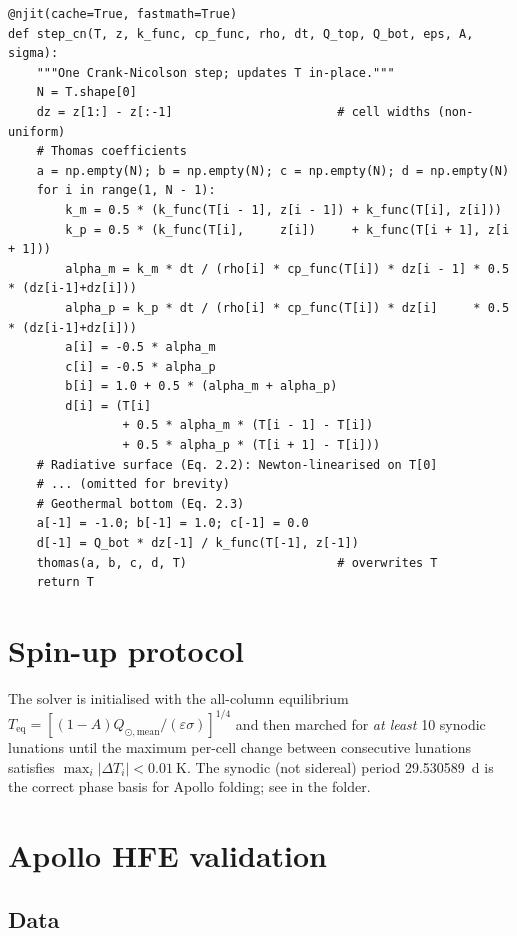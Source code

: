 \begin{lstlisting}[caption={Crank--Nicolson inner loop from \code{lunar/solver\_cn.py} (abridged).},label={lst:solver-core}]
@njit(cache=True, fastmath=True)
def step_cn(T, z, k_func, cp_func, rho, dt, Q_top, Q_bot, eps, A, sigma):
    """One Crank-Nicolson step; updates T in-place."""
    N = T.shape[0]
    dz = z[1:] - z[:-1]                       # cell widths (non-uniform)
    # Thomas coefficients
    a = np.empty(N); b = np.empty(N); c = np.empty(N); d = np.empty(N)
    for i in range(1, N - 1):
        k_m = 0.5 * (k_func(T[i - 1], z[i - 1]) + k_func(T[i], z[i]))
        k_p = 0.5 * (k_func(T[i],     z[i])     + k_func(T[i + 1], z[i + 1]))
        alpha_m = k_m * dt / (rho[i] * cp_func(T[i]) * dz[i - 1] * 0.5 * (dz[i-1]+dz[i]))
        alpha_p = k_p * dt / (rho[i] * cp_func(T[i]) * dz[i]     * 0.5 * (dz[i-1]+dz[i]))
        a[i] = -0.5 * alpha_m
        c[i] = -0.5 * alpha_p
        b[i] = 1.0 + 0.5 * (alpha_m + alpha_p)
        d[i] = (T[i]
                + 0.5 * alpha_m * (T[i - 1] - T[i])
                + 0.5 * alpha_p * (T[i + 1] - T[i]))
    # Radiative surface (Eq. 2.2): Newton-linearised on T[0]
    # ... (omitted for brevity)
    # Geothermal bottom (Eq. 2.3)
    a[-1] = -1.0; b[-1] = 1.0; c[-1] = 0.0
    d[-1] = Q_bot * dz[-1] / k_func(T[-1], z[-1])
    thomas(a, b, c, d, T)                     # overwrites T
    return T
\end{lstlisting}

\section{Spin-up protocol}

The solver is initialised with the all-column equilibrium
$T_{\mathrm{eq}} = \left[(1-A)Q_{\odot,\mathrm{mean}}/(\varepsilon\sigma)
\right]^{1/4}$ and then marched for \emph{at least} 10 synodic lunations
until the maximum per-cell change between consecutive lunations
satisfies $\max_i |\Delta T_i| < \SI{0.01}{\kelvin}$.  The synodic (not
sidereal) period \SI{29.530589}{\day} is the correct phase basis for
Apollo folding; see  in the
 folder.

\section{Apollo HFE validation}

\subsection{Data}

